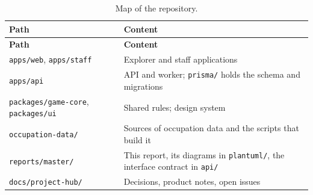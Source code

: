 {\small{}\renewcommand{\arraystretch}{1.1}
\begin{longtable}{|>{\raggedright\arraybackslash}p{}|>{\raggedright\arraybackslash}p{}|}
\caption{Map of the repository.} \\
\hline
\textbf{Path} & \textbf{Content} \\ \hline
\endfirsthead
\hline
\textbf{Path} & \textbf{Content} \\ \hline
\endhead
\texttt{apps/\allowbreak{}web}, \texttt{apps/\allowbreak{}staff} & Explorer and staff applications \\ \hline
\texttt{apps/\allowbreak{}api} & API and worker; \texttt{prisma/\allowbreak{}} holds the schema and migrations \\ \hline
\texttt{packages/\allowbreak{}game-\allowbreak{}core}, \texttt{packages/\allowbreak{}ui} & Shared rules; design system \\ \hline
\texttt{occupation-\allowbreak{}data/\allowbreak{}} & Sources of occupation data and the scripts that build it \\ \hline
\texttt{reports/\allowbreak{}master/\allowbreak{}} & This report, its diagrams in \texttt{plantuml/\allowbreak{}}, the interface contract in \texttt{api/\allowbreak{}} \\ \hline
\texttt{docs/\allowbreak{}project-\allowbreak{}hub/\allowbreak{}} & Decisions, product notes, open issues \\ \hline
\end{longtable}
}
